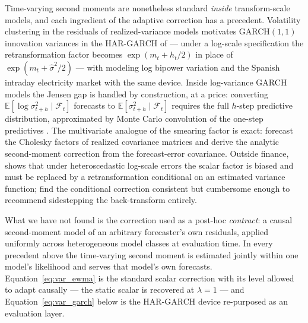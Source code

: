 Time-varying second moments are nonetheless standard \emph{inside}
transform-scale models, and each ingredient of the adaptive correction
has a precedent. Volatility clustering in the residuals of
realized-variance models motivates GARCH$(1,1)$ innovation variances
in the HAR-GARCH of \citet{CorsiMittnikPigorschPigorsch2008} ---
under a log-scale specification the retransformation factor becomes
$\exp(m_t + h_t/2)$ in place of $\exp(m_t + \hat\sigma^2/2)$ ---
with \citet{BollerslevKretschmerPigorschTauchen2009} modeling log
bipower variation and \citet{CiarretaZarraga2016} the Spanish
intraday electricity market with the same device. Inside log-variance
GARCH models the Jensen gap is handled by construction, at a price:
converting $\mathbb{E}[\log \sigma^2_{t+h} \mid \mathcal{F}_t]$
forecasts to $\mathbb{E}[\sigma^2_{t+h} \mid \mathcal{F}_t]$ requires
the full $h$-step predictive distribution, approximated by Monte Carlo
convolution of the one-step predictives
\citep{AndersenBollerslevChristoffersenDiebold2006}. The multivariate
analogue of the smearing factor is exact: \citet{ChiriacVoev2011}
forecast the Cholesky factors of realized covariance matrices and
derive the analytic second-moment correction from the forecast-error
covariance. Outside finance, \citet{Manning1998} shows that under
heteroscedastic log-scale errors the scalar \citet{Duan1983} factor is
biased and must be replaced by a retransformation conditional on an
estimated variance function; \citet{ManningMullahy2001} find the
conditional correction consistent but cumbersome enough to recommend
sidestepping the back-transform entirely.

What we have not found is the correction used as a post-hoc
\emph{contract}: a causal second-moment model of an arbitrary
forecaster's own residuals, applied uniformly across heterogeneous
model classes at evaluation time. In every precedent above the
time-varying second moment is estimated jointly within one model's
likelihood and serves that model's own forecasts.
Equation~\eqref{eq:var_ewma} is the standard scalar correction with
its level allowed to adapt causally --- the static scalar is recovered
at $\lambda = 1$ --- and Equation~\eqref{eq:var_garch} below is the
HAR-GARCH device re-purposed as an evaluation layer.

